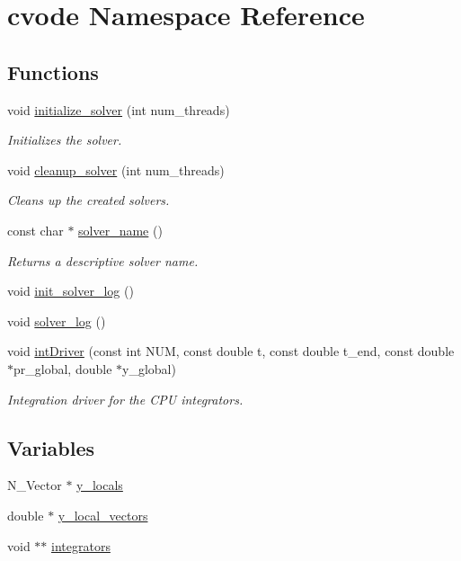 \hypertarget{namespacecvode}{}\section{cvode Namespace Reference}
\label{namespacecvode}
\subsection*{Functions}
\begin{DoxyCompactItemize}
\item 
void \hyperlink{namespacecvode_abe146525cea80d8032cd30b4441b5872}{initialize\+\_\+solver} (int num\+\_\+threads)
\begin{DoxyCompactList}\small\item\em Initializes the solver. \end{DoxyCompactList}\item 
void \hyperlink{namespacecvode_ac9bc4957bff6721dae9d7e4cc470d184}{cleanup\+\_\+solver} (int num\+\_\+threads)
\begin{DoxyCompactList}\small\item\em Cleans up the created solvers. \end{DoxyCompactList}\item 
const char $\ast$ \hyperlink{namespacecvode_a3a26024b8dc2ce6f8b2afcfb7c82c79f}{solver\+\_\+name} ()
\begin{DoxyCompactList}\small\item\em Returns a descriptive solver name. \end{DoxyCompactList}\item 
void \hyperlink{namespacecvode_a9113d5fb0e19fa927d73b64c397ecd09}{init\+\_\+solver\+\_\+log} ()
\item 
void \hyperlink{namespacecvode_af7eb796b6829fecab506fb6dfec39be0}{solver\+\_\+log} ()
\item 
void \hyperlink{namespacecvode_ae8209853c343190233f2500020b1cd5f}{int\+Driver} (const int N\+UM, const double t, const double t\+\_\+end, const double $\ast$pr\+\_\+global, double $\ast$y\+\_\+global)
\begin{DoxyCompactList}\small\item\em Integration driver for the C\+PU integrators. \end{DoxyCompactList}\end{DoxyCompactItemize}
\subsection*{Variables}
\begin{DoxyCompactItemize}
\item 
N\+\_\+\+Vector $\ast$ \hyperlink{namespacecvode_a84c47b6a9f2bedf2c5c80429079fc8e3}{y\+\_\+locals}
\item 
double $\ast$ \hyperlink{namespacecvode_adae183039534044ead74e1c1a786a36c}{y\+\_\+local\+\_\+vectors}
\item 
void $\ast$$\ast$ \hyperlink{namespacecvode_a9290e27651628dff03f82f42eafd3079}{integrators}
\end{DoxyCompactItemize}


